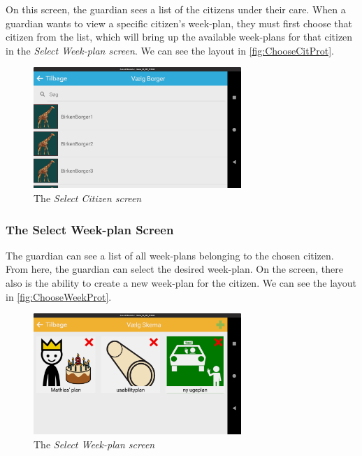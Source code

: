 On this screen, the \gls{guardian} sees a list of the citizens under their care. When a \gls{guardian} wants to view a specific \gls{citizen}'s week-plan, they must first choose that \gls{citizen} from the list, which will bring up the available week-plans for that \gls{citizen} in the \textit{Select Week-plan screen}. We can see the layout in \autoref{fig:ChooseCitProt}.

\begin{figure}[H]
    \begin{center}
        \includegraphics[width=0.7\textwidth]{figures/Prototypes/ChooseCitizenPrototype.png}
    \end{center}
    \caption{The \textit{Select Citizen screen}}
    \label{fig:ChooseCitProt}
\end{figure}

\subsubsection{The Select Week-plan Screen}

The \gls{guardian} can see a list of all week-plans belonging to the chosen \gls{citizen}. From here, the \gls{guardian} can select the desired week-plan. On the screen, there also is the ability to create a new week-plan for the citizen. We can see the layout in \autoref{fig:ChooseWeekProt}.

\begin{figure}[H]
    \begin{center}
        \includegraphics[width=0.7\textwidth]{figures/Prototypes/SelectWeekplanPrototype.png}
    \end{center}
    \caption{The \textit{Select Week-plan screen}}
    \label{fig:ChooseWeekProt}
\end{figure}

